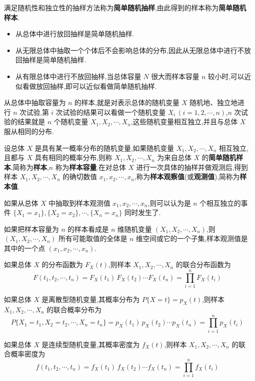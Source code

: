 满足随机性和独立性的抽样方法称为\textbf{简单随机抽样},由此得到的样本称为\textbf{简单随机样本}.

\begin{itemize}
    \item 从总体中进行放回抽样是简单随机抽样.
    \item 从无限总体中抽取一个个体后不会影响总体的分布,因此从无限总体中进行不放回抽样是简单随机抽样.
    \item 从有限总体中进行不放回抽样,当总体容量 $N$ 很大而样本容量 $n$ 较小时,可以近似看做放回抽样,即可以近似看做简单随机抽样.
\end{itemize}

从总体中抽取容量为 $n$ 的样本,就是对表示总体的随机变量 $X$ 随机地、独立地进行 $n$ 次试验,第 $i$ 次试验的结果可以看做一个随机变量 $X_i \, (i=1,2,\cdots,n)$,$n$ 次试验的结果就是 $n$ 个随机变量 $X_1,X_2,\cdots,X_n$,这些随机变量相互独立,并且与总体 $X$ 服从相同的分布.

\begin{definition}
    设总体 $X$ 是具有某一概率分布的随机变量,如果随机变量 $X_1,X_2,\cdots,X_n$ 相互独立,且都与 $X$ 具有相同的概率分布,则称 $X_1,X_2,\cdots,X_n$ 为来自总体 $X$ 的\textbf{简单随机样本},简称为\textbf{样本},$n$ 称为\textbf{样本容量}.在对总体 $X$ 进行一次具体的抽样并做观测后,得到样本 $X_1,X_2,\cdots,X_n$ 的确切数值 $x_1,x_2,\cdots,x_n$,称为\textbf{样本观察值}(或\textbf{观测值}),简称为\textbf{样本值}.
\end{definition}

如果从总体 $X$ 中抽取到样本观测值 $x_1,x_2,\cdots,x_n$,则可以认为是 $n$ 个相互独立的事件 $\{X_1=x_1\}, \{X_2=x_2\}, \cdots, \{X_n=x_n\}$ 同时发生了.

如果把样本容量为 $n$ 的样本看成是 $n$ 维随机变量 $(X_1,X_2,\cdots,X_n)$,则 $(X_1,X_2,\cdots,X_n)$ 所有可能取值的全体是 $n$ 维空间或它的一个子集,样本观测值是其中的一个点 $(x_1,x_2,\cdots,x_n)$.

如果总体 $X$ 的分布函数为 $F_X(t)$,则样本 $X_1,X_2,\cdots,X_n$ 的联合分布函数为
$$
F(t_1,t_2,\cdots,t_n) = F_X(t_1) \, F_X(t_2) \cdots F_X(t_n) = \prod_{i=1}^{n} F_X(t_i)
$$

如果总体 $X$ 是离散型随机变量,其概率分布为 $P \{ X=t \} = p_X(t)$,则样本 $X_1,X_2,\cdots,X_n$ 的联合概率分布为
$$
P \{ X_1=t_1, X_2=t_2, \cdots, X_n=t_n \} = p_X(t_1) \, p_X(t_2) \cdots p_X(t_n) = \prod_{i=1}^n p_X(t_i)
$$

如果总体 $X$ 是连续型随机变量,其概率密度为 $f_X(t)$,则样本 $X_1,X_2,\cdots,X_n$ 的联合概率密度为
$$
f(t_1,t_2,\cdots,t_n) = f_X(t_1) \, f_X(t_2) \cdots f_X(t_n) = \prod_{i=1}^n f_X(t_i)
$$

